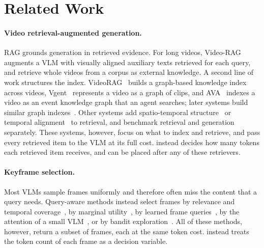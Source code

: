 \section{Related Work}
\label{sec:related}

\paragraph{Video retrieval-augmented generation.}
RAG grounds generation in retrieved evidence. For long videos, Video-RAG~\cite{luo2024videorag} augments a VLM with
visually aligned auxiliary texts retrieved for each query, and \citet{jeong2025videorag} retrieve whole videos from a corpus as external knowledge. A second line
of work structures the index. VideoRAG~\cite{ren2025videorag} builds a graph-based knowledge index across videos,
Vgent~\cite{shen2025vgent} represents a video as a graph of clips, and AVA~\cite{yan2025ava} indexes a
video as an event knowledge graph that an agent searches; later systems build similar graph
indexes~\cite{yang2026g2frag,chen2026memdreamer,yan2026ecrag}. Other systems add spatio-temporal
structure~\cite{fu2026videostir} or temporal alignment~\cite{cao2025tvrag} to retrieval, and
\citet{lee2026rethinking} benchmark retrieval and generation separately.
These systems, however, focus on what to index and retrieve, and pass every retrieved item to the VLM at its full
cost. \name instead decides how many tokens each retrieved item receives, and can be placed after any of these
retrievers.

\paragraph{Keyframe selection.}
Most VLMs sample frames uniformly and therefore often miss the content that a query needs. Query-aware methods instead
select frames by relevance and temporal coverage~\cite{tang2025aks,peng2026qca}, by marginal
utility~\cite{shi2026markey}, by learned frame queries~\cite{yu2024framevoyager}, by the attention of a small
VLM~\cite{wang2026dafs}, or by bandit exploration~\cite{zhu2026focus}. All of these methods, however, return a subset of frames,
each at the same token cost. \name instead treats the token count of each frame as a decision variable.

